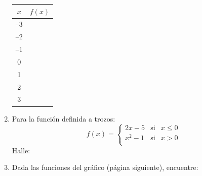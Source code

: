 \documentclass[fleqn]{article}
\begin{document}
\begin{enumerate}
\begin{minipage}{0.5\textwidth}
\begin{tabular}{|c|c|}\hline
$x$ & $f(x)$\\ \hline
--3 & \\ \hline
--2 & \\ \hline
--1 & \\ \hline
0 & \\ \hline
1 & \\ \hline
2 & \\ \hline
3 & \\ \hline
\end{tabular}
\end{minipage}\hfill
\begin{minipage}{0.45\textwidth}
\end{minipage}
\item Para la función definida a trozos:
\[f(x)=\left\{ \begin{array}{lcl}
              2x-5 & \mbox{si} & x\leq0\\
              x^{2}-1 & \mbox{si} & x>0\\
             \end{array}
\right. \]
Halle:
\begin{enumerate}
\end{enumerate}

\item Dada las funciones del gráfico (página siguiente), encuentre:


\end{enumerate}
\end{document}

